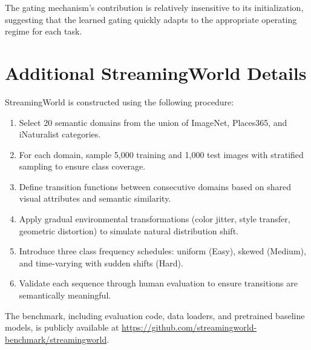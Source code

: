 \documentclass[11pt]{article}
\begin{document}
The gating mechanism's contribution is relatively insensitive to its initialization, suggesting that the learned gating quickly adapts to the appropriate operating regime for each task.

\section{Additional StreamingWorld Details}
\label{app:streaming}

StreamingWorld is constructed using the following procedure:
\begin{enumerate}
    \item Select 20 semantic domains from the union of ImageNet, Places365, and iNaturalist categories.
    \item For each domain, sample 5,000 training and 1,000 test images with stratified sampling to ensure class coverage.
    \item Define transition functions between consecutive domains based on shared visual attributes and semantic similarity.
    \item Apply gradual environmental transformations (color jitter, style transfer, geometric distortion) to simulate natural distribution shift.
    \item Introduce three class frequency schedules: uniform (Easy), skewed (Medium), and time-varying with sudden shifts (Hard).
    \item Validate each sequence through human evaluation to ensure transitions are semantically meaningful.
\end{enumerate}

The benchmark, including evaluation code, data loaders, and pretrained baseline models, is publicly available at \url{https://github.com/streamingworld-benchmark/streamingworld}.
\end{document}
